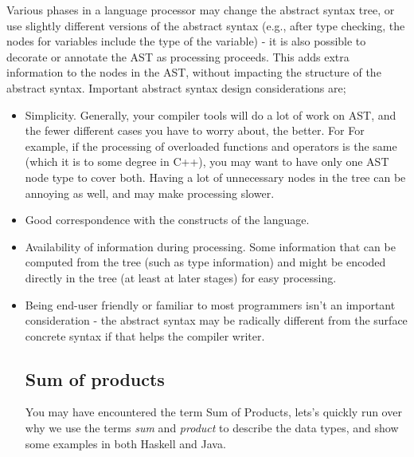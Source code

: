         Various phases in a language processor may change the abstract syntax
        tree, or use slightly different versions of the abstract syntax (e.g., after type
        checking, the nodes for variables include the type of the variable) - it is also
        possible to decorate or annotate the AST as processing proceeds. 
        This adds extra information to the nodes in the AST, without impacting the structure of the abstract syntax.
        Important abstract syntax design considerations are;
        \begin{itemize}
            \item Simplicity. Generally, your compiler tools will do a lot of work on AST,
            and the fewer different cases you have to worry about, the better. For
            For example, if the processing of overloaded functions and operators is the same (which it is to some degree in C++), you may want to have
            only one AST node type to cover both. Having a lot of unnecessary nodes
            in the tree can be annoying as well, and may make processing slower.
            \item Good correspondence with the constructs of the language.
            \item Availability of information during processing. Some information that
            can be computed from the tree (such as type information) and might be encoded directly in the tree (at least at later stages) for easy processing.
            \item Being end-user friendly or familiar to most programmers isn't an important consideration - the abstract syntax may be radically different from
            the surface concrete syntax if that helps the compiler writer.

            \subsection{Sum of products}
            You may have encountered the term \gls{Sum of Products}, lets's quickly run over why we use the terms \textit{sum} and \textit{product} 
            to describe the data types, and show some examples in both Haskell and Java.

\end{itemize}

